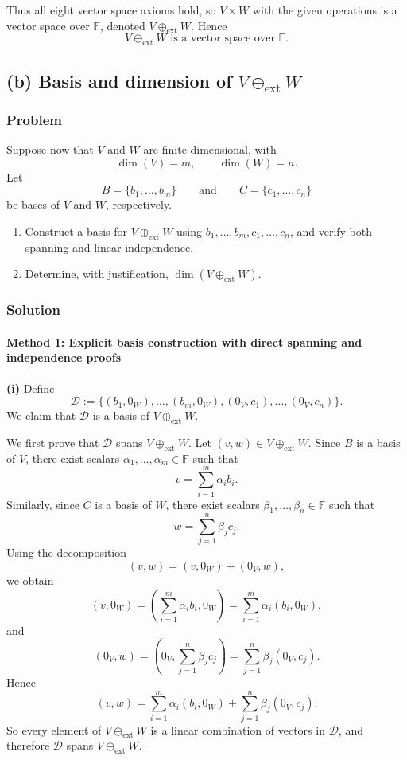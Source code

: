 \documentclass[12pt]{article}
\begin{document}
Thus all eight vector space axioms hold, so \(V\times W\) with the given operations is a vector space over \(\mathbb F\), denoted \(V\oplus_{\mathrm{ext}}W\). Hence
\[
\boxed{V\oplus_{\mathrm{ext}}W\text{ is a vector space over }\mathbb F.}
\]

\bigskip

\newpage
\subsection{(b) Basis and dimension of \(V\oplus_{\mathrm{ext}}W\)}
\subsubsection{Problem}
Suppose now that \(V\) and \(W\) are finite-dimensional, with
\[
\dim(V)=m,\qquad \dim(W)=n.
\]
Let
\[
B=\{b_1,\ldots,b_m\}
\qquad\text{and}\qquad
C=\{c_1,\ldots,c_n\}
\]
be bases of \(V\) and \(W\), respectively.

\begin{enumerate}[label=(\roman*)]
\item Construct a basis for \(V\oplus_{\mathrm{ext}}W\) using \(b_1,\ldots,b_m,c_1,\ldots,c_n\), and verify both spanning and linear independence.
\item Determine, with justification, \(\dim(V\oplus_{\mathrm{ext}}W)\).
\end{enumerate}

\subsubsection{Solution}

\paragraph{Method 1: Explicit basis construction with direct spanning and independence proofs}

\noindent \textbf{(i)} Define
\[
\mathcal D
:=
\{(b_1,0_W),\ldots,(b_m,0_W),(0_V,c_1),\ldots,(0_V,c_n)\}.
\]
We claim that \(\mathcal D\) is a basis of \(V\oplus_{\mathrm{ext}}W\).

We first prove that \(\mathcal D\) spans \(V\oplus_{\mathrm{ext}}W\). Let \((v,w)\in V\oplus_{\mathrm{ext}}W\). Since \(B\) is a basis of \(V\), there exist scalars \(\alpha_1,\ldots,\alpha_m\in\mathbb F\) such that
\[
v=\sum_{i=1}^m \alpha_i b_i.
\]
Similarly, since \(C\) is a basis of \(W\), there exist scalars \(\beta_1,\ldots,\beta_n\in\mathbb F\) such that
\[
w=\sum_{j=1}^n \beta_j c_j.
\]
Using the decomposition
\[
(v,w)=(v,0_W)+(0_V,w),
\]
we obtain
\[
(v,0_W)=\left(\sum_{i=1}^m \alpha_i b_i,0_W\right)
=\sum_{i=1}^m \alpha_i (b_i,0_W),
\]
and
\[
(0_V,w)=\left(0_V,\sum_{j=1}^n \beta_j c_j\right)
=\sum_{j=1}^n \beta_j (0_V,c_j).
\]
Hence
\[
(v,w)=\sum_{i=1}^m \alpha_i (b_i,0_W)+\sum_{j=1}^n \beta_j (0_V,c_j).
\]
So every element of \(V\oplus_{\mathrm{ext}}W\) is a linear combination of vectors in \(\mathcal D\), and therefore \(\mathcal D\) spans \(V\oplus_{\mathrm{ext}}W\).
\end{document}
